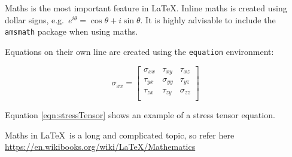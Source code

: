 \documentclass[a4paper,12pt]{article}
\begin{document}
Maths is the most important feature in \LaTeX. Inline maths is created using dollar signs, e.g.\ $e^{i\theta}=\cos\theta + i\sin\theta$. It is highly advisable to include the \texttt{amsmath} package when using maths.

Equations on their own line are created using the \texttt{equation} environment:

\begin{equation}
  \sigma_{xx} =
  \begin{bmatrix}
    \sigma_{xx} & \tau_{xy}   & \tau_{xz}   \\
    \tau_{yx}   & \sigma_{yy} & \tau_{yz}   \\
    \tau_{zx}   & \tau_{zy}   & \sigma_{zz} \\
  \end{bmatrix}
  \label{eqn:stressTensor}
\end{equation}

Equation \ref{eqn:stressTensor} shows an example of a stress tensor equation.

Maths in \LaTeX\ is a long and complicated topic, so refer here \url{https://en.wikibooks.org/wiki/LaTeX/Mathematics}
\end{document}
